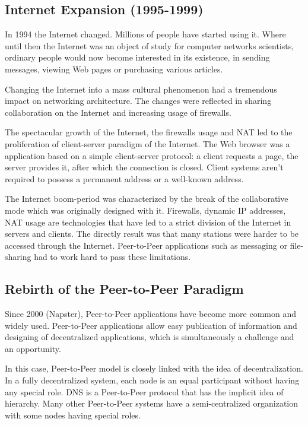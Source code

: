 \subsection{Internet Expansion (1995-1999)}

In 1994 the Internet changed. Millions of people have started using it. Where
until then the Internet was an object of study for computer networks
scientists, ordinary people would now become interested in its existence, in
sending messages, viewing Web pages or purchasing various articles.

Changing the Internet into a mass cultural phenomenon had a tremendous impact
on networking architecture. The changes were reflected in sharing collaboration
on the Internet and increasing usage of firewalls.

The spectacular growth of the Internet, the firewalls usage and NAT led to the
proliferation of client-server paradigm of the Internet. The Web browser was a
application based on a simple client-server protocol: a client requests a
page, the server provides it, after which the connection is closed. Client
systems aren't required to possess a permanent address or a well-known
address.

The Internet boom-period was characterized by the break of the collaborative
mode which was originally designed with it. Firewalls, dynamic IP addresses,
NAT usage are technologies that have led to a strict division of the Internet
in servers and clients. The directly result was that many stations were
harder to be accessed through the Internet. Peer-to-Peer applications such as
messaging or file-sharing had to work hard to pass these limitations.

\subsection{Rebirth of the Peer-to-Peer Paradigm}

Since 2000 (Napster), Peer-to-Peer applications have become more common and
widely used. Peer-to-Peer applications allow easy publication of information
and designing of decentralized applications, which is simultaneously a
challenge and an opportunity.

In this case, Peer-to-Peer model is closely linked with the idea of
decentralization. In a fully decentralized system, each node is an equal
participant without having any special role. DNS is a Peer-to-Peer protocol
that has the implicit idea of hierarchy. Many other Peer-to-Peer systems have
a semi-centralized organization with some nodes having special roles.

